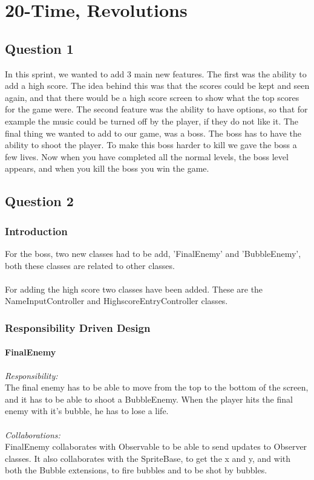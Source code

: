 \chapter{20-Time, Revolutions}

\section{Question 1}

In this sprint, we wanted to add 3 main new features. The first was the ability to add a high score. The idea behind this was that the scores could be kept and seen again, and that there would be a high score screen to show what the top scores for the game were. The second feature was the ability to have options, so that for example the music could be turned off by the player, if they do not like it. The final thing we wanted to add to our game, was a boss. The boss has to have the ability to shoot the player. To make this boss harder to kill we gave the boss a few lives. Now when you have completed all the normal levels, the boss level appears, and when you kill the boss you win the game.

\section{Question 2}

\subsection{Introduction}

For the boss, two new classes had to be add, 'FinalEnemy' and 'BubbleEnemy', both these classes are related to other classes. \\\\
For adding the high score two classes have been added. These are the NameInputController and HighscoreEntryController classes. 

\subsection{Responsibility Driven Design} 

\subsubsection{FinalEnemy}
\textit{Responsibility:} \\
The final enemy has to be able to move from the top to the bottom of the screen, and it has to be able to shoot a BubbleEnemy. When the player hits the final enemy with it's bubble, he has to lose a life. \\ \\
\textit{Collaborations:} \\
FinalEnemy collaborates with Observable to be able to send updates to Observer classes. It also collaborates with  the SpriteBase, to get the x and y, and with both the Bubble extensions, to fire bubbles and to be shot by bubbles.

